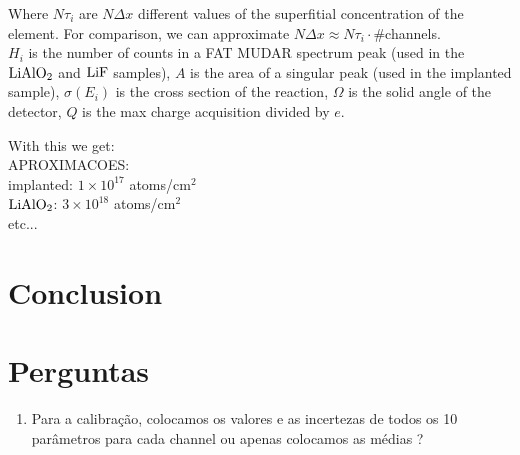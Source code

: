 \documentclass{article}
\begin{document}
\begin{multicols}{2}
Where $N\tau_i$ are $N\Delta x$ different values of the superfitial concentration of the element. For comparison, we can approximate $N\Delta x \approx N\tau_i \cdot$\#channels.\\
$H_i$ is the number of counts in a FAT MUDAR spectrum peak (used in the $\ce{LiAlO2}$ and $\ce{LiF}$ samples), $A$ is the area of a singular peak (used in the implanted sample), $\sigma (E_i) $ is the cross section of the reaction, $\Omega$ is the solid angle of the detector, $Q$ is the max charge acquisition divided by $e$.

With this we get:\\
APROXIMACOES:\\
implanted: $1\times10^{17}$ atoms/cm$^2$\\
$\ce{LiAlO2}$: $3\times10^{18}$ atoms/cm$^2$\\
etc...\\

\section{Conclusion}

\section{Perguntas}

\begin{enumerate}
    \item Para a calibração, colocamos os valores e as incertezas de todos os 10 parâmetros para cada channel ou apenas colocamos as médias ?
\end{enumerate}

\section{}


\printbibliography
\nocite{*}

\end{multicols}
\end{document}
